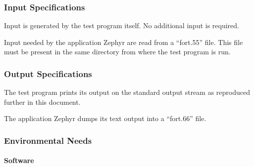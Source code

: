 \subsubsection{Input Specifications}

Input is generated by the test program itself. No additional input
is required.

Input needed by the application Zephyr are read from a ``fort.55''
file. This file must be present in the same directory from where
the test program is run.

\subsubsection{Output Specifications}

The test program prints its output on the
standard output stream  as reproduced further in this document.

The application Zephyr dumps its text output into a ``fort.66'' file.


\subsubsection{Environmental Needs}




\paragraph{Software}

